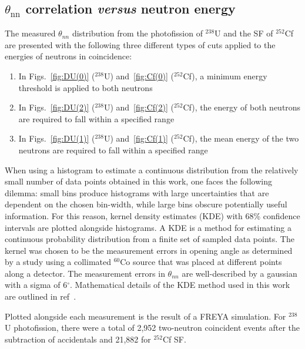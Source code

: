 \subsection{$\theta_{\text{nn}}$ correlation \emph{versus} neutron energy}
The measured $\theta_{nn}$ distribution from the photofission of $^{238}$U and the SF of $^{252}$Cf are presented with the following three different types of cuts applied to the energies of neutrons in coincidence:
\begin{enumerate}[label=(\roman*), itemjoin={{, }}, itemjoin*={{, or }}]
    \item In Figs.~\ref{fig:DU(0)} ($^{238}$U) and~\ref{fig:Cf(0)} ($^{252}$Cf), a minimum energy threshold is applied to both neutrons
    \item In Figs.~\ref{fig:DU(2)} ($^{238}$U) and~\ref{fig:Cf(2)} ($^{252}$Cf), the energy of both neutrons are required to fall within a specified range
  \item In Figs.~\ref{fig:DU(1)} ($^{238}$U) and~\ref{fig:Cf(1)} ($^{252}$Cf), the mean energy of the two neutrons are required to fall within a specified range
 \end{enumerate}

When using a histogram to estimate a continuous distribution from the relatively small number of data points obtained in this work, one faces the following dilemma: small bins produce histograms with large uncertainties that are dependent on the chosen bin-width, while large bins obscure potentially useful information. 
For this reason, kernel density estimates (KDE) with 68\% confidence intervals are plotted alongside histograms.
A KDE is a method for estimating a continuous probability distribution from a finite set of sampled data points.
The kernel was chosen to be the measurement errors in opening angle as determined by a study using a collimated $^{60}$Co source that was placed at different points along a detector.
The measurement errors in $\theta_{nn}$ are well-described by a gaussian with a sigma of 6$^{\circ}$.
Mathematical details of the KDE method used in this work are outlined in ref~\cite{KDE}. 

Plotted alongside each measurement is the result of a FREYA simulation.
For $^{238}$U photofission, there were a total of 2,952 two-neutron coincident events after the subtraction of accidentals and 21,882 for $^{252}$Cf SF.

